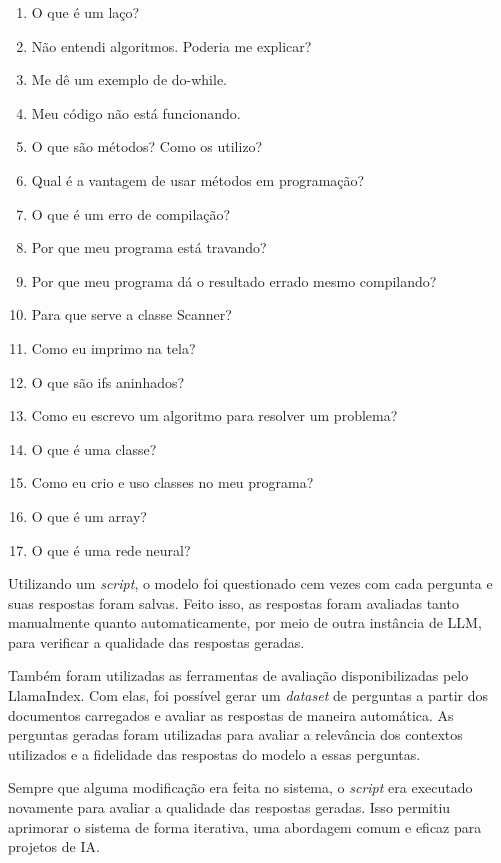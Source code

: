 \documentclass[journal]{IEEEtran}
\begin{document}
\begin{enumerate}
    \item O que é um laço?
    \item Não entendi algoritmos. Poderia me explicar?
    \item Me dê um exemplo de do-while.
    \item Meu código não está funcionando.
    \item O que são métodos? Como os utilizo?
    \item Qual é a vantagem de usar métodos em programação?
    \item O que é um erro de compilação?
    \item Por que meu programa está travando?
    \item Por que meu programa dá o resultado errado mesmo compilando?
    \item Para que serve a classe Scanner?
    \item Como eu imprimo na tela?
    \item O que são ifs aninhados?
    \item Como eu escrevo um algoritmo para resolver um problema?
    \item O que é uma classe?
    \item Como eu crio e uso classes no meu programa?
    \item O que é um array?
    \item O que é uma rede neural?
\end{enumerate}

Utilizando um \textit{script}, o modelo foi questionado cem vezes com cada pergunta e suas respostas foram salvas.
Feito isso, as respostas foram avaliadas tanto manualmente quanto automaticamente, por meio de outra instância de LLM\@, para verificar a qualidade das respostas geradas.

Também foram utilizadas as ferramentas de avaliação disponibilizadas pelo LlamaIndex.
Com elas, foi possível gerar um \textit{dataset} de perguntas a partir dos documentos carregados e avaliar as respostas de maneira automática.
As perguntas geradas foram utilizadas para avaliar a relevância dos contextos utilizados e a fidelidade das respostas do modelo a essas perguntas.

Sempre que alguma modificação era feita no sistema, o \textit{script} era executado novamente para avaliar a qualidade das respostas geradas.
Isso permitiu aprimorar o sistema de forma iterativa, uma abordagem comum e eficaz para projetos de IA\@.
\end{document}
